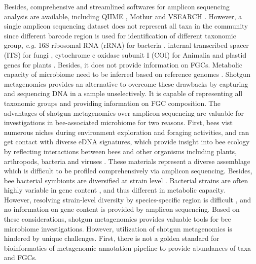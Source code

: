 \documentclass[11pt]{article}
\begin{document}
Besides, comprehensive and streamlined softwares for amplicon sequencing analysis are available, including QIIME \citep{bolyen2019reproducible}, Mothur \citep{schloss2020reintroducing} and VSEARCH \citep{rognes2016vsearch}. 
However, a single amplicon sequencing dataset does not represent all taxa in the community since different barcode region is used for identification of different taxonomic group, \textit{e.g.} 
16S ribosomal RNA (rRNA) for bacteria \citep{hayashi2002phylogenetic,eckburg2005diversity}, 
internal transcribed spacer (ITS) for fungi \citep{nilsson2008intraspecific}, 
cytochrome c oxidase subunit I (COI) for Animalia \citep{hebert2003barcoding} 
and plastid genes for plants \citep{group2009dna}. 
Besides, it does not provide information on FGCs. 
Metabolic capacity of microbiome need to be inferred based on reference genomes . 
Shotgun metagenomics provides an alternative to overcome these drawbacks by capturing and sequencing DNA in a sample unselectively. 
It is capable of representing all taxonomic groups and providing information on FGC composition. 
\newline
The advantages of shotgun metagenomics over amplicon sequencing are valuable for investigations in bee-associated microbiome for two reasons. 
First, bees vist numerous niches during environment exploration and foraging activities, and can get contact with diverse eDNA signatures, which provide insight into bee ecology by reflecting interactions between bees and other organisms including plants, arthropods, bacteria and viruses \citep{bovo2018shotgun,ribani2020honey,bovo2020shotgun,matsuzawa2020application}. 
These materials represent a diverse assemblage which is difficult to be profiled comprehensively via amplicon sequencing. 
Besides, bee bacterial symbionts are diversified at strain level \citep{engel2012functional,powell2016strain,ellegaard2020vast}. 
Bacterial strains are often highly variable in gene content \citep{cordero2014explaining,brockhurst2019ecology}, and thus different in metabolic capacity. 
However, resolving strain-level diversity by species-specific region is difficult \citep{rodriguez2018much,ciufo2018using,olm2020consistent}, and no information on gene content is provided by amplicon sequencing. 
Based on these considerations, shotgun metagenomics provides valuable tools for bee microbiome investigations. 
However, utilization of shotgun metagenomics is hindered by unique challenges. 
First, there is not a golden standard for bioinformatics of metagenomic annotation pipeline to provide abundances of taxa and FGCs. 
\end{document}
